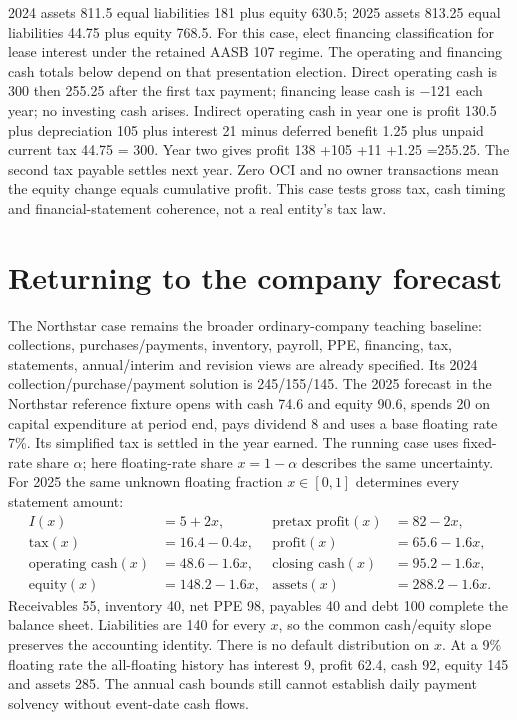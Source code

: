 2024 assets 811.5 equal liabilities 181 plus equity 630.5; 2025 assets 813.25 equal liabilities 44.75 plus equity 768.5. For this case, elect financing classification for lease interest under the retained AASB 107 regime. The operating and financing cash totals below depend on that presentation election. Direct operating cash is 300 then 255.25 after the first tax payment; financing lease cash is \ensuremath{-}121 each year; no investing cash arises. Indirect operating cash in year one is profit 130.5 plus depreciation 105 plus interest 21 minus deferred benefit 1.25 plus unpaid current tax 44.75 = 300. Year two gives profit 138 +105 +11 +1.25 =255.25. The second tax payable settles next year. Zero OCI and no owner transactions mean the equity change equals cumulative profit. This case tests gross tax, cash timing and financial-statement coherence, not a real entity's tax law.



\hypertarget{returning-to-the-company-forecast}{%
\section{Returning to the company forecast}\label{method-corporate-methods-returning-to-the-company-forecast}}

The Northstar case remains the broader ordinary-company teaching baseline: collections, purchases/payments, inventory, payroll, PPE, financing, tax, statements, annual/interim and revision views are already specified. Its 2024 collection/purchase/payment solution is 245/155/145. The 2025 forecast in the Northstar reference fixture opens with cash 74.6 and equity 90.6, spends 20 on capital expenditure at period end, pays dividend 8 and uses a base floating rate 7\%. Its simplified tax is settled in the year earned. The running case uses fixed-rate share $\alpha$; here floating-rate share $x=1-\alpha$ describes the same uncertainty. For 2025 the same unknown floating fraction $x\in[0,1]$ determines every
statement amount:
\begin{align*}
 I(x)&=5+2x, & \text{pretax profit}(x)&=82-2x,\\
 \text{tax}(x)&=16.4-0.4x, & \text{profit}(x)&=65.6-1.6x,\\
 \text{operating cash}(x)&=48.6-1.6x, & \text{closing cash}(x)&=95.2-1.6x,\\
 \text{equity}(x)&=148.2-1.6x, & \text{assets}(x)&=288.2-1.6x.
\end{align*}
Receivables 55, inventory 40, net PPE 98, payables 40 and debt 100 complete the
balance sheet. Liabilities are 140 for every $x$, so the common cash/equity
slope preserves the accounting identity. There is no default distribution on
$x$. At a 9\% floating rate the all-floating history has interest 9, profit
62.4, cash 92, equity 145 and assets 285. The annual cash bounds still cannot
establish daily payment solvency without event-date cash flows.

